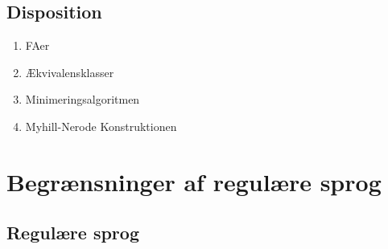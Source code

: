 \documentclass[a4, danish]{article}
\begin{document}
\newpage
\subsection{Disposition}
\begin{enumerate}
  \item FAer
  \item Ækvivalensklasser
  \item Minimeringsalgoritmen 
  \item Myhill-Nerode Konstruktionen 
\end{enumerate}

\newpage  
\section{Begrænsninger af regulære sprog}
\subsection{Regulære sprog}
\end{document}

